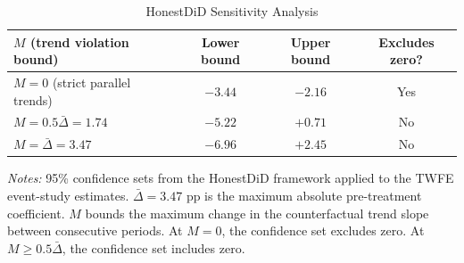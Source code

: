 \documentclass[12pt]{article}
\begin{document}
\begin{table}[H]
    \centering
    \caption{HonestDiD Sensitivity Analysis}
    \begin{threeparttable}
    \begin{tabular}{lccc}
        \toprule
        $M$ (trend violation bound) & Lower bound & Upper bound & Excludes zero? \\
        \midrule
        $M = 0$ (strict parallel trends) & $-3.44$ & $-2.16$ & Yes \\
        $M = 0.5\bar{\Delta} = 1.74$ & $-5.22$ & $+0.71$ & No \\
        $M = \bar{\Delta} = 3.47$ & $-6.96$ & $+2.45$ & No \\
        \bottomrule
    \end{tabular}
    \begin{tablenotes}[flushleft]
    \small
    \item \textit{Notes:} 95\% confidence sets from the \citet{rambachan2023more} HonestDiD framework applied to the TWFE event-study estimates. $\bar{\Delta} = 3.47$ pp is the maximum absolute pre-treatment coefficient. $M$ bounds the maximum change in the counterfactual trend slope between consecutive periods. At $M = 0$, the confidence set excludes zero. At $M \geq 0.5\bar{\Delta}$, the confidence set includes zero.
    \end{tablenotes}
    \end{threeparttable}
    \label{tab:honestdid}
\end{table}
\end{document}
